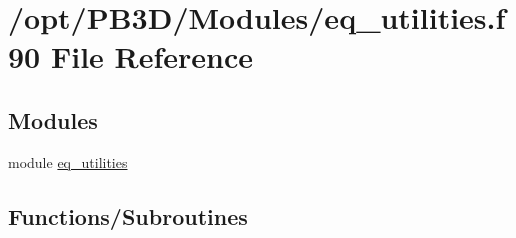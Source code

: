 \hypertarget{eq__utilities_8f90}{}\section{/opt/\+P\+B3\+D/\+Modules/eq\+\_\+utilities.f90 File Reference}
\label{eq__utilities_8f90}
\subsection*{Modules}
\begin{DoxyCompactItemize}
\item 
module \hyperlink{namespaceeq__utilities}{eq\+\_\+utilities}
\end{DoxyCompactItemize}
\subsection*{Functions/\+Subroutines}
